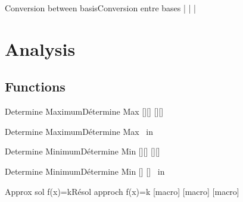 \documentclass[a4paper,english,11pt]{article}
\begin{document}
\begin{myprestex}{Conversion between basis}{Conversion entre bases}
 |         %
 |       %
 |   %
\end{myprestex}

\newpage

\section{Analysis}

\subsection{Functions}

\begin{myprestexcode}{Determine Maximum}{Détermine Max}
[\tmpmax][\tmpmaxvalx]
[\tmpmax][\tmpmaxvalx]
\end{myprestexcode}

\begin{myprestex}{Determine Maximum}{Détermine Max}
\tmpmax\ in \tmpmaxvalx
\end{myprestex}

\begin{myprestexcode}{Determine Minimum}{Détermine Min}
[\tmpmax][\tmpmaxvalx]
[\tmpmax][\tmpmaxvalx]
\end{myprestexcode}

\begin{myprestex}{Determine Minimum}{Détermine Min}
%
  [\mymin]%
  [\myminx]%
\mymin\ in \myminx
\end{myprestex}

\begin{myprestexcode}{Approx sol f(x)=k}{Résol approch f(x)=k}
[macro]
[macro]
[macro]

%
\end{myprestexcode}
\end{document}
